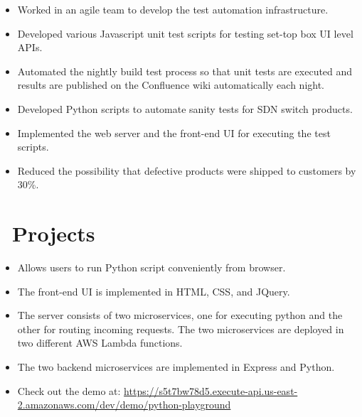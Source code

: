 \documentclass{resume}
\begin{document}
\begin{itemize}
	\item Worked in an agile team to develop the test automation infrastructure.
	\item Developed various Javascript unit test scripts for testing set-top box UI level APIs.
	\item Automated the nightly build test process so that unit tests are executed and results are published on the Confluence wiki automatically each night.
\end{itemize}

\begin{itemize}
	\item Developed Python scripts to automate sanity tests for SDN switch products.
	\item Implemented the web server and the front-end UI for executing the test scripts. 
	\item Reduced the possibility that defective products were shipped to customers by 30\%.
\end{itemize}

\section{\faUsers\ Projects}
\begin{itemize}
	\item Allows users to run Python script conveniently from browser. 
	\item The front-end UI is implemented in HTML, CSS, and JQuery.
	\item The server consists of two microservices, one for executing python and the other for routing incoming requests. The two microservices are deployed in two different AWS Lambda functions.
	\item The two backend microservices are implemented in Express and Python.
	\item Check out the demo at: \url{https://s5t7bw78d5.execute-api.us-east-2.amazonaws.com/dev/demo/python-playground}  
\end{itemize}
\end{document}
